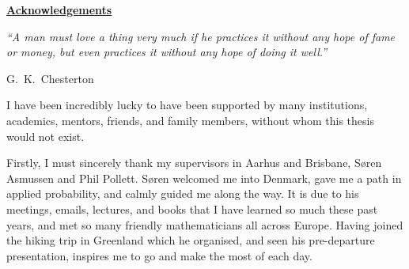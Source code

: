 


\newpage

{\bf \underline{Acknowledgements}}

\vspace{-1em}
\begin{center}
\emph{``A man must love a thing very much if he practices it without any hope of fame or money, but even practices it without any hope of doing it well.''}
\end{center}
\vspace{-1.6em}
\hfill G.\ K.\ Chesterton~~~~~~~~

I have been incredibly lucky to have been supported by many institutions, academics, mentors, friends, and family members, without whom this thesis would not exist. %

Firstly, I must sincerely thank my supervisors in Aarhus and Brisbane, S{\o}ren Asmussen and Phil Pollett. S{\o}ren welcomed me into Denmark, gave me a path in applied probability, and calmly guided me along the way. It is due to his meetings, emails, lectures, and books that I have learned so much these past years, and met so many friendly mathematicians all across Europe. Having joined the hiking trip in Greenland which he organised, and seen his pre-departure presentation, inspires me to go and make the most of each day.%


